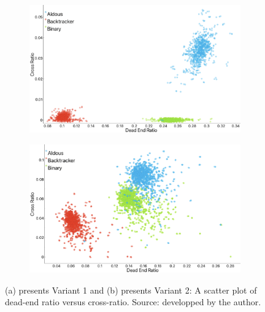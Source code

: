          \begin{figure}[!h]
            \centering
            \begin{subfigure}[!h]{0.7\textwidth}
                \includegraphics[width=1\linewidth]{crossvSDeas_variant1.png}
               \caption{}
            \end{subfigure}
            \begin{subfigure}[!h]{0.7\textwidth}
                \includegraphics[width=1\linewidth]{crossvSDead_variant2.png}
               \caption{}
            \end{subfigure}
            \caption{(a) presents Variant 1 and (b) presents Variant 2: A scatter plot of dead-end ratio versus cross-ratio. Source: developped by the author.}
            \end{figure}
\newpage
\newpage
\newline
\newpage\
\\
\\
\\
\\
\\
\newline
\newline
\newline
\newline
\newpage
\newline
\newpage\
\\
\\
\\
\\
\\
\newline
\newline
\newline
\newline
